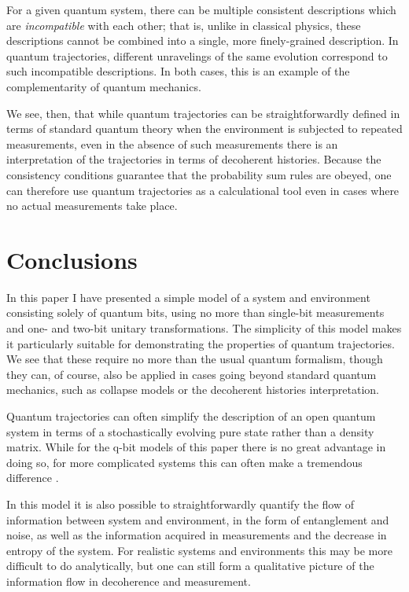 For a given quantum system, there can be multiple consistent descriptions
which are {\it incompatible} with each other; that is, unlike in classical
physics, these descriptions cannot be combined into a single, more
finely-grained description.  In quantum trajectories, different unravelings
of the same evolution correspond to such incompatible descriptions.
In both cases, this is an example of the complementarity of quantum
mechanics.

We see, then, that while quantum trajectories can be straightforwardly
defined in terms of standard quantum theory when the environment is
subjected to repeated measurements, even in the absence of such measurements
there is an interpretation of the trajectories in terms of decoherent
histories.  Because the consistency conditions guarantee that the
probability sum rules are obeyed, one can therefore use quantum trajectories
as a calculational tool even in cases where no actual measurements
take place.


\section{Conclusions}

In this paper I have presented a simple model of a system and environment
consisting solely of quantum bits, using no more than single-bit
measurements and one- and two-bit unitary transformations.  The
simplicity of this model makes it particularly suitable for demonstrating
the properties of quantum trajectories.  We see that these require no
more than the usual quantum formalism, though they can, of course, also
be applied in cases going beyond standard quantum mechanics, such as
collapse models or the decoherent histories interpretation.

Quantum trajectories can often simplify the description of an open
quantum system in terms of a stochastically evolving pure state rather
than a density matrix.  While for the q-bit models of this paper there
is no great advantage in doing so, for more complicated systems this
can often make a tremendous difference \cite{Schack}.

In this model it is also possible to straightforwardly quantify the
flow of information between system and environment, in the form of
entanglement and noise, as well as the information acquired in measurements
and the decrease in entropy of the system.  For realistic systems
and environments this may be more difficult to do analytically, but one
can still form a qualitative picture of the information flow in
decoherence and measurement.

